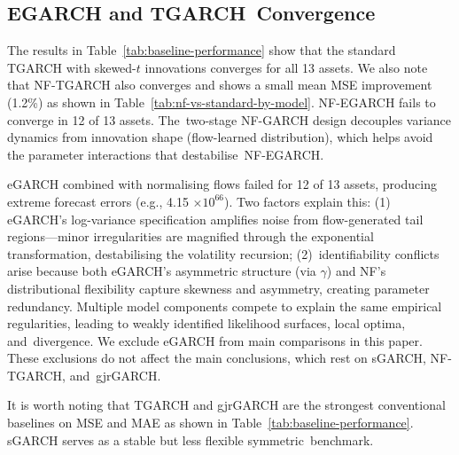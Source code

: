 \documentclass[risks,article,accept,pdftex,moreauthors]{Definitions/mdpi}
\begin{document}
\subsection{EGARCH and TGARCH~Convergence}
The results in Table~\ref{tab:baseline-performance} show that the standard TGARCH with skewed-$t$ innovations converges for all 13 assets. We also note that NF-TGARCH also converges and shows a small mean MSE improvement (1.2\%) as shown in Table~\ref{tab:nf-vs-standard-by-model}. NF-EGARCH fails to converge in 12 of 13 assets. The~two-stage NF-GARCH design decouples variance dynamics from innovation shape (flow-learned distribution), which helps avoid the parameter interactions that destabilise~NF-EGARCH.

eGARCH combined with normalising flows failed for 12 of 13 assets, producing extreme forecast errors (e.g., {4.15 $\times 10^{66}$).} %
 Two factors explain this: (1) eGARCH's log-variance specification amplifies noise from flow-generated tail regions—minor irregularities are magnified through the exponential transformation, destabilising the volatility recursion; (2)~identifiability conflicts arise because both eGARCH's asymmetric structure (via $\gamma$) and NF's distributional flexibility capture skewness and asymmetry, creating parameter redundancy. Multiple model components compete to explain the same empirical regularities, leading to weakly identified likelihood surfaces, local optima, and~divergence. We exclude eGARCH from main comparisons in this paper. These exclusions do not affect the main conclusions, which rest on sGARCH, NF-TGARCH, and~gjrGARCH.

It is worth noting that TGARCH and gjrGARCH are the strongest conventional baselines on MSE and MAE as shown in Table~\ref{tab:baseline-performance}. sGARCH serves as a stable but less flexible symmetric~benchmark. 
\end{document}
